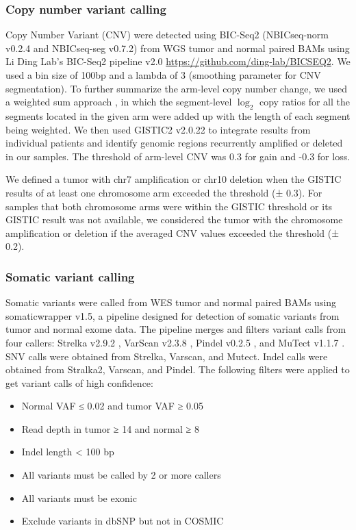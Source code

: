 \subsubsection{Copy number variant calling}
Copy Number Variant (CNV) were detected using BIC-Seq2 (NBICseq-norm v0.2.4 and NBICseq-seg v0.7.2) \cite{xir_parkpj:CopyNumber2016} from WGS tumor and normal paired BAMs using Li Ding Lab’s BIC-Seq2 pipeline v2.0 \url{https://github.com/ding-lab/BICSEQ2}. We used a bin size of 100bp and a lambda of 3 (smoothing parameter for CNV segmentation). To further summarize the arm-level copy number change, we used a weighted sum approach \cite{vasaikars_clinicalproteomictumoranalysisconsortium:ProteogenomicAnalysis2019}, in which the segment-level $\log_2$ copy ratios for all the segments located in the given arm were added up with the length of each segment being weighted. We then used GISTIC2 v2.0.22 \cite{mermelch_getzg:GISTIC2Facilitates2011} to integrate results from individual patients and identify genomic regions recurrently amplified or deleted in our samples. The threshold of arm-level CNV was 0.3 for gain and -0.3 for loss.

We defined a tumor with chr7 amplification or chr10 deletion when the GISTIC results of at least one chromosome arm exceeded the threshold (± 0.3). For samples that both chromosome arms were within the GISTIC threshold or its GISTIC result was not available, we considered the tumor with the chromosome amplification or deletion if the averaged CNV values exceeded the threshold (± 0.2).

\subsubsection{Somatic variant calling}
Somatic variants were called from WES tumor and normal paired BAMs using somaticwrapper v1.5, a pipeline designed for detection of somatic variants from tumor and normal exome data. The pipeline merges and filters variant calls from four callers: Strelka v2.9.2 \cite{kims_saundersct:Strelka2Fast2018}, VarScan v2.3.8 \cite{koboldtdc_wilsonrk:VarScan22012}, Pindel v0.2.5 \cite{yek_ningz:Pindel2009}, and MuTect v1.1.7 \cite{cibulskisk_getzg:SensitiveDetection2013}. SNV calls were obtained from Strelka, Varscan, and Mutect. Indel calls were obtained from Stralka2, Varscan, and Pindel. The following filters were applied to get variant calls of high confidence:

\begin{itemize}
    \tightlist
    \item Normal VAF ≤ 0.02 and tumor VAF ≥ 0.05
    \item Read depth in tumor ≥ 14 and normal ≥ 8
    \item Indel length < 100 bp
    \item All variants must be called by 2 or more callers
    \item All variants must be exonic
    \item Exclude variants in dbSNP but not in COSMIC
\end{itemize}

